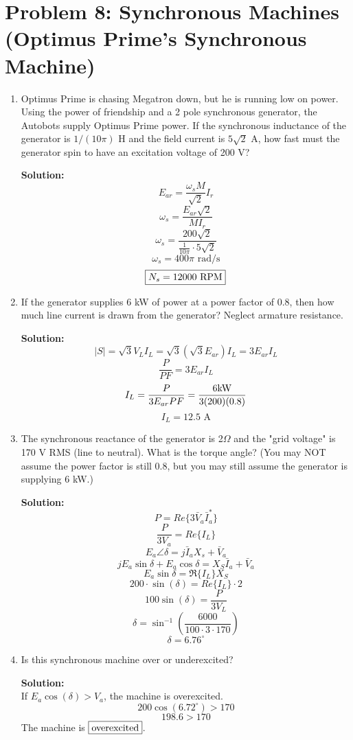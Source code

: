 \documentclass{article}
\begin{document}
\section*{Problem 8: Synchronous Machines (Optimus Prime's Synchronous Machine)}  
\begin{enumerate}[label=(\alph*)]
    \item {Optimus Prime is chasing Megatron down, but he is running low on power. Using the power of friendship and a 2 pole synchronous generator, the Autobots supply Optimus Prime power. If the synchronous inductance of the generator is $1/(10\pi)$ H and the field current is $5\sqrt{2}$ A, how fast must the generator spin to have an excitation voltage of 200 V?}

\textbf{Solution:}
$$E_{ar} = \frac{\omega_s M}{\sqrt{2}}I_r$$
$$\omega_s = \frac{E_{ar}\sqrt{2}}{MI_r}$$
$$\omega_s = \frac{200\sqrt{2}}{\frac{1}{10\pi}\cdot 5\sqrt{2}}$$
$$\omega_s = 400\pi \text{ rad/s}$$
$$\boxed{N_s = 12000 \ \rm RPM}$$

    \item {If the generator supplies 6 kW of power at a power factor of 0.8, then how much line current is drawn from the generator? Neglect armature resistance.}

\textbf{Solution:}
$$|S| = \sqrt{3}V_LI_L = \sqrt{3}(\sqrt{3}E_{ar})I_L = 3E_{ar}I_L$$
$$\frac{P}{PF} = 3E_{ar}I_L$$
$$I_L = \frac{P}{3E_{ar}PF} = \frac{6\rm kW}{3(200)(0.8)}$$
$$\boxed{I_L = 12.5\text{ A}}$$

    \item {The synchronous reactance of the generator is 2$\Omega$ and the "grid voltage" is 170 V RMS (line to neutral). What is the torque angle? (You may NOT assume the power factor is still 0.8, but you may still assume the generator is supplying 6 kW.)}

\textbf{Solution:}
$$P = Re\{3\bar{V}_a\bar{I}_a^{\ast}\}$$
$$\frac{P}{3V_a} = Re\{I_L\}$$
$$E_a \angle \delta = j\bar{I}_aX_s + \bar{V}_a$$
$$jE_a\sin \delta + E_a \cos \delta = X_S\bar{I}_a + \bar{V}_a$$
$$E_a\sin \delta = \Re\{I_L\}X_S$$
$$200\cdot \sin(\delta) = Re\{I_L\} \cdot 2$$
$$100\sin(\delta) = \frac{P}{3V_L}$$
$$\delta = \sin^{-1}(\frac{6000}{100\cdot 3 \cdot 170})$$
$$\boxed{\delta = 6.76^{\circ}}$$

    \item{Is this synchronous machine over or underexcited? }

\textbf{Solution:}\\
If $E_{a}\cos(\delta) > V_a$, the machine is overexcited.
$$200\cos(6.72^{\circ}) > 170$$
$$198.6 > 170$$
The machine is $\boxed{\rm overexcited}$.
\end{enumerate}
\newpage %
\noindent 
\end{document}
